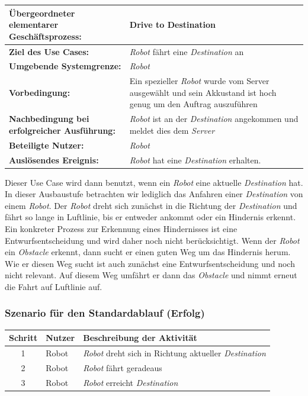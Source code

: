 \documentclass[includeheaders]{scrartcl}
\begin{document}
			\begin{table}[H]
				\centering
				\begin{tabularx}{\textwidth}{@{}p{5cm}X@{}}
				\toprule
				\textbf{Übergeordneter elementarer Geschäftsprozess:} & Drive to Destination\\ \midrule
				\textbf{Ziel des Use Cases:} & \emph{Robot} fährt eine \emph{Destination} an\\ \midrule
				\textbf{Umgebende Systemgrenze:} & \emph{Robot} \\ \midrule
				\textbf{Vorbedingung:} & Ein spezieller \emph{Robot} wurde vom Server ausgewählt und sein Akkustand ist hoch genug um den Auftrag auszuführen \\ \midrule
				\textbf{Nachbedingung bei erfolgreicher Ausführung:} & \emph{Robot} ist an der \emph{Destination} angekommen und meldet dies dem \emph{Server} \\ \midrule
				\textbf{Beteiligte Nutzer:} & \emph{Robot} \\ \midrule
				\textbf{Auslösendes Ereignis:} & \emph{Robot} hat eine \emph{Destination} erhalten. \\
				\bottomrule
				\end{tabularx}
			\end{table}

			Dieser Use Case wird dann benutzt, wenn ein \emph{Robot} eine aktuelle
			\emph{Destination} hat. In dieser Ausbaustufe betrachten wir lediglich das Anfahren
			einer \emph{Destination} von einem \emph{Robot}. Der \emph{Robot} dreht sich zunächst in die
			Richtung der \emph{Destination} und fährt so lange in Luftlinie, bis er entweder
			ankommt oder ein Hindernis erkennt. Ein konkreter Prozess zur Erkennung
			eines Hindernisses ist eine Entwurfsentscheidung und wird daher noch
			nicht berücksichtigt. Wenn der \emph{Robot} ein \emph{Obstacle} erkennt, dann
			sucht er einen guten Weg um das Hindernis herum. Wie er diesen Weg sucht
			ist auch zunächst eine Entwurfsentscheidung und noch nicht relevant. Auf
			diesem Weg umfährt er dann das \emph{Obstacle} und nimmt erneut die Fahrt auf
			Luftlinie auf.

			\subsubsection*{Szenario für den Standardablauf (Erfolg)}

			\begin{table}[H]
				\centering
				\begin{tabularx}{\textwidth}{@{}cp{2cm}X@{}}
				\toprule
				Schritt & Nutzer & Beschreibung der Aktivität \\ \midrule
				1 & Robot & \emph{Robot} dreht sich in Richtung aktueller \emph{Destination} \\
				2 & Robot & \emph{Robot} fährt geradeaus \\
				3 & Robot & \emph{Robot} erreicht \emph{Destination} \\
				\bottomrule
				\end{tabularx}
			\end{table}
\end{document}
